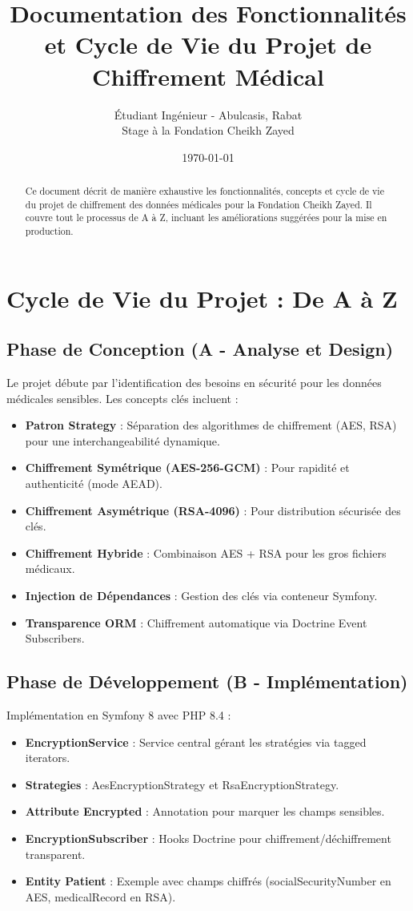 \documentclass{article}
\title{Documentation des Fonctionnalités et Cycle de Vie du Projet de Chiffrement Médical}
\author{Étudiant Ingénieur - Abulcasis, Rabat \\ Stage à la Fondation Cheikh Zayed}
\date{\today}
\begin{document}
\maketitle

\begin{abstract}
Ce document décrit de manière exhaustive les fonctionnalités, concepts et cycle de vie du projet de chiffrement des données médicales pour la Fondation Cheikh Zayed. Il couvre tout le processus de A à Z, incluant les améliorations suggérées pour la mise en production.
\end{abstract}

\tableofcontents
\newpage

\section{Cycle de Vie du Projet : De A à Z}

\subsection{Phase de Conception (A - Analyse et Design)}
Le projet débute par l'identification des besoins en sécurité pour les données médicales sensibles. Les concepts clés incluent :
\begin{itemize}
    \item \textbf{Patron Strategy} : Séparation des algorithmes de chiffrement (AES, RSA) pour une interchangeabilité dynamique.
    \item \textbf{Chiffrement Symétrique (AES-256-GCM)} : Pour rapidité et authenticité (mode AEAD).
    \item \textbf{Chiffrement Asymétrique (RSA-4096)} : Pour distribution sécurisée des clés.
    \item \textbf{Chiffrement Hybride} : Combinaison AES + RSA pour les gros fichiers médicaux.
    \item \textbf{Injection de Dépendances} : Gestion des clés via conteneur Symfony.
    \item \textbf{Transparence ORM} : Chiffrement automatique via Doctrine Event Subscribers.
\end{itemize}

\subsection{Phase de Développement (B - Implémentation)}
Implémentation en Symfony 8 avec PHP 8.4 :
\begin{itemize}
    \item \textbf{EncryptionService} : Service central gérant les stratégies via tagged iterators.
    \item \textbf{Strategies} : AesEncryptionStrategy et RsaEncryptionStrategy.
    \item \textbf{Attribute Encrypted} : Annotation pour marquer les champs sensibles.
    \item \textbf{EncryptionSubscriber} : Hooks Doctrine pour chiffrement/déchiffrement transparent.
    \item \textbf{Entity Patient} : Exemple avec champs chiffrés (socialSecurityNumber en AES, medicalRecord en RSA).
\end{itemize}
\end{document}
